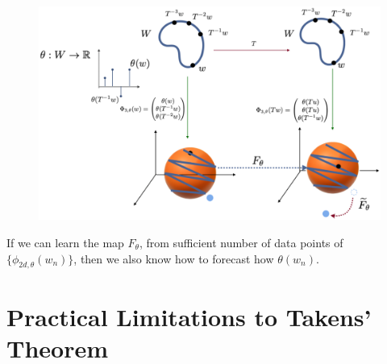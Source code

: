 \documentclass[a4paper,12pt,twoside]{report}
\newcommand{\Ftheta}{\ensuremath{F_\theta}}
\begin{document}
\begin{figure}[ht]
  \includegraphics[scale=0.25]{_takensmap.eps}
  \centering
  \label{fig:takensmap}
\end{figure}

If we can learn the map $F_\theta$, from sufficient number of data points of $\{\phi_{2d,\theta}(w_n)\}$, then we also know how to forecast how $\theta(w_n)$. 




\section{Practical Limitations to Takens' Theorem}
\end{document}
